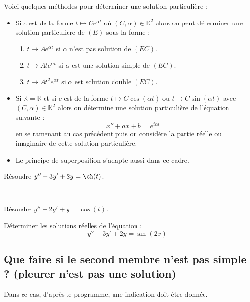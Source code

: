 \documentclass[a4paper,10pt]{report}
\begin{document}
\medskip

Voici quelques méthodes pour déterminer une solution particulière : 

\begin{itemize}
\item Si $c$ est de la forme $t \mapsto C e^{\alpha t}$ où $(C, \alpha) \in \mathbb{K}^2$ alors on peut déterminer une solution particulière de $(E)$ sous la forme :
\begin{enumerate}
\item $t \mapsto A e^{\alpha t}$ si $\alpha$ n'est pas solution de $(EC)$.
\item $t \mapsto At e^{\alpha t}$ si $\alpha$ est une solution \og simple \fg de $(EC)$.
\item $t \mapsto At^2 e^{\alpha t}$ si $\alpha$ est solution \og double \fg $(EC)$.
\end{enumerate}
\item Si $\mathbb{K}= \mathbb{R}$ et si $c$ est de la forme $t \mapsto C \cos(\alpha t)$ ou $t \mapsto C \sin(\alpha t)$ avec $(C, \alpha) \in \mathbb{K}^2$ alors on détermine une solution particulière de l'équation suivante :
$$ x''+ax+b= e^{i \alpha t}$$
en se ramenant au cas précédent puis on considère la partie réelle ou imaginaire de cette solution particulière.
\item Le principe de superposition s'adapte aussi dans ce cadre.
\end{itemize}

\begin{Exemple} Résoudre $y'' + 3y' + 2y = \ch(t)$.

\vspace{10cm}
\end{Exemple}

\newpage

$\phantom{test}$

\vspace{10cm}

\begin{Exemple} Résoudre $y''+2y'+y= \cos(t)$.

\vspace{10cm}
\end{Exemple}

\begin{ApplicationDirecte} Déterminer les solutions réelles de l'équation :
  \[
   y'' - 3y' + 2y = \sin(2x)
  \]
\end{ApplicationDirecte} 
\subsection{Que faire si le second membre n'est pas \og simple \fg ? (pleurer n'est pas une solution)}
Dans ce cas, d'après le programme, une indication doit être donnée.
\end{document}
